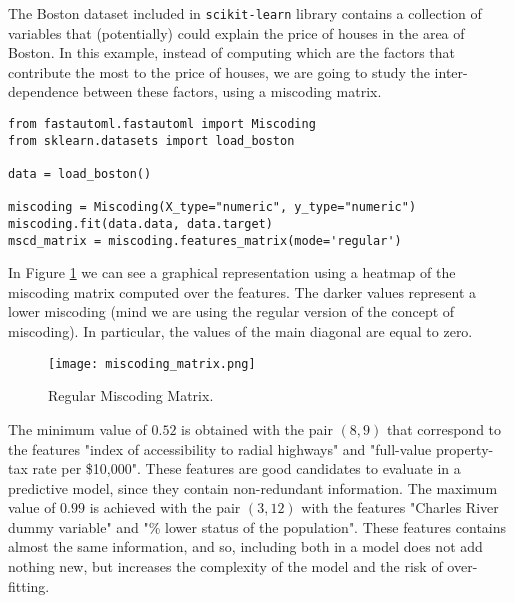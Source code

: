\begin{example}
\label{example:miscoding_boston}
The Boston dataset included in \texttt{scikit-learn} library contains a collection of variables that (potentially) could explain the price of houses in the area of Boston. In this example, instead of computing which are the factors that contribute the most to the price of houses, we are going to study the inter-dependence between these factors, using a miscoding matrix.

\begin{sourcecode}
{\scriptsize \begin{verbatim}
from fastautoml.fastautoml import Miscoding
from sklearn.datasets import load_boston

data = load_boston()

miscoding = Miscoding(X_type="numeric", y_type="numeric")
miscoding.fit(data.data, data.target)
mscd_matrix = miscoding.features_matrix(mode='regular')
\end{verbatim}}
\end{sourcecode}

In Figure \ref{figure:miscoding_matrix} we can see a graphical representation using a heatmap of the miscoding matrix computed over the features. The darker values represent a lower miscoding (mind we are using the regular version of the concept of miscoding). In particular, the values of the main diagonal are equal to zero. 

\begin{figure}[h]
\centering
\texttt{[image: miscoding\_matrix.png]}
\caption{Regular Miscoding Matrix.}
\label{figure:miscoding_matrix}
\end{figure}

The minimum value of $0.52$ is obtained with the pair $(8, 9)$ that correspond to the features "index of accessibility to radial highways" and "full-value property-tax rate per \$10,000". These features are good candidates to evaluate in a predictive model, since they contain non-redundant information. The maximum value of $0.99$ is achieved with the pair $(3, 12)$ with the features "Charles River dummy variable" and "\% lower status of the population". These features contains almost the same information, and so, including both in a model does not add nothing new, but increases the complexity of the model and the risk of over-fitting.

\end{example}

%
%

